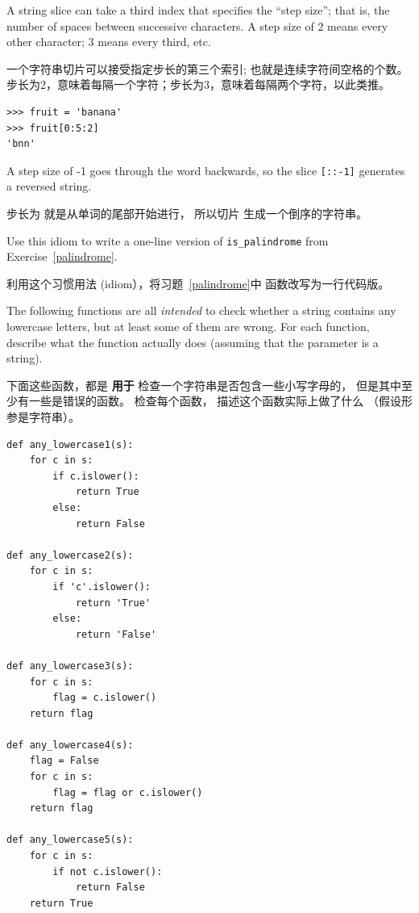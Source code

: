\begin{exercise}
    

A string slice can take a third index that specifies the ``step
size''; that is, the number of spaces between successive characters.
A step size of 2 means every other character; 3 means every third,
etc.

一个字符串切片可以接受指定步长的第三个索引; 也就是连续字符间空格的个数。步长为2，意味着每隔一个字符；步长为3，意味着每隔两个字符，以此类推。


\begin{lstlisting}
>>> fruit = 'banana'
>>> fruit[0:5:2]
'bnn'
\end{lstlisting}

A step size of -1 goes through the word backwards, so
the slice \verb"[::-1]" generates a reversed string.

步长为  就是从单词的尾部开始进行， 所以切片 \li{[::-1]} 生成一个倒序的字符串。

Use this idiom to write a one-line version of \verb"is_palindrome"
from Exercise~\ref{palindrome}.

利用这个习惯用法 (idiom），将习题~\ref{palindrome}中  函数改写为一行代码版。

\end{exercise}

\begin{exercise}

The following functions are all {\em intended} to check whether a
string contains any lowercase letters, but at least some of them are
wrong.  For each function, describe what the function actually does
(assuming that the parameter is a string).

下面这些函数，都是 {\bf 用于} 检查一个字符串是否包含一些小写字母的， 但是其中至少有一些是错误的函数。 检查每个函数， 描述这个函数实际上做了什么 （假设形参是字符串）。

\begin{lstlisting}
def any_lowercase1(s):
    for c in s:
        if c.islower():
            return True
        else:
            return False

def any_lowercase2(s):
    for c in s:
        if 'c'.islower():
            return 'True'
        else:
            return 'False'

def any_lowercase3(s):
    for c in s:
        flag = c.islower()
    return flag

def any_lowercase4(s):
    flag = False
    for c in s:
        flag = flag or c.islower()
    return flag

def any_lowercase5(s):
    for c in s:
        if not c.islower():
            return False
    return True
\end{lstlisting}

\end{exercise}



